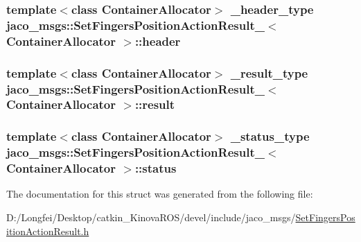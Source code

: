 \subsubsection[{\texorpdfstring{header}{header}}]{\setlength{\rightskip}{0pt plus 5cm}template$<$class Container\+Allocator$>$ {\bf \+\_\+header\+\_\+type} {\bf jaco\+\_\+msgs\+::\+Set\+Fingers\+Position\+Action\+Result\+\_\+}$<$ Container\+Allocator $>$\+::header}\hypertarget{structjaco__msgs_1_1SetFingersPositionActionResult___afe9c9e9a117299f47004490d673fca99}{}\label{structjaco__msgs_1_1SetFingersPositionActionResult___afe9c9e9a117299f47004490d673fca99}
\subsubsection[{\texorpdfstring{result}{result}}]{\setlength{\rightskip}{0pt plus 5cm}template$<$class Container\+Allocator$>$ {\bf \+\_\+result\+\_\+type} {\bf jaco\+\_\+msgs\+::\+Set\+Fingers\+Position\+Action\+Result\+\_\+}$<$ Container\+Allocator $>$\+::result}\hypertarget{structjaco__msgs_1_1SetFingersPositionActionResult___a56e4fe7830f94aed326d00adc8cf0ac3}{}\label{structjaco__msgs_1_1SetFingersPositionActionResult___a56e4fe7830f94aed326d00adc8cf0ac3}
\subsubsection[{\texorpdfstring{status}{status}}]{\setlength{\rightskip}{0pt plus 5cm}template$<$class Container\+Allocator$>$ {\bf \+\_\+status\+\_\+type} {\bf jaco\+\_\+msgs\+::\+Set\+Fingers\+Position\+Action\+Result\+\_\+}$<$ Container\+Allocator $>$\+::status}\hypertarget{structjaco__msgs_1_1SetFingersPositionActionResult___a2071f3ed40cf494554bf7dab9b8da10d}{}\label{structjaco__msgs_1_1SetFingersPositionActionResult___a2071f3ed40cf494554bf7dab9b8da10d}


The documentation for this struct was generated from the following file\+:\begin{DoxyCompactItemize}
\item 
D\+:/\+Longfei/\+Desktop/catkin\+\_\+\+Kinova\+R\+O\+S/devel/include/jaco\+\_\+msgs/\hyperlink{SetFingersPositionActionResult_8h}{Set\+Fingers\+Position\+Action\+Result.\+h}\end{DoxyCompactItemize}
